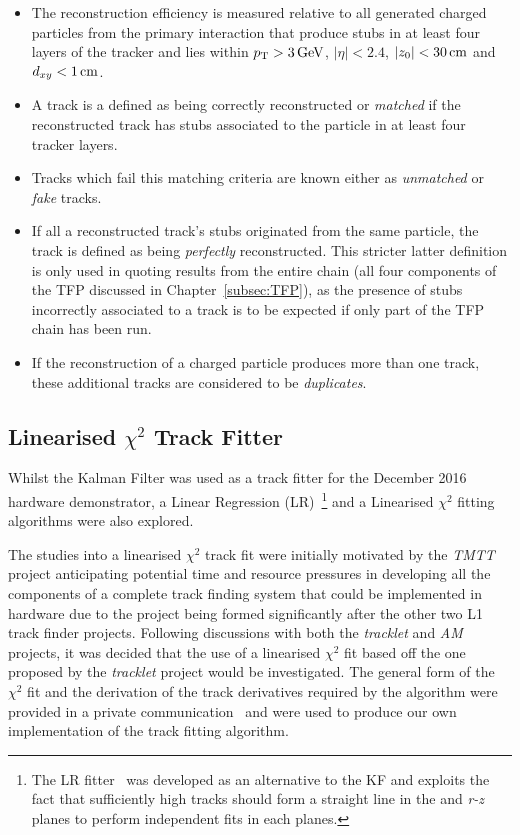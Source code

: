 \begin{itemize}
\item The reconstruction efficiency is measured relative to all generated charged particles from the primary interaction that produce stubs in at least four layers of the tracker and lies within $p_{\mathrm{T}} > 3\,\text{Ge\hspace{-.08em}V}$, $|\eta| < 2.4$, $|z_{0}| < 30\,\text{cm}$ and $d_{xy} < 1\,\text{cm}$.
\item A track is a defined as being correctly reconstructed or \emph{matched} if the reconstructed track has stubs associated to the particle in at least four tracker layers.
\item Tracks which fail this matching criteria are known either as \emph{unmatched} or \emph{fake} tracks.
\item If all a reconstructed track's stubs originated from the same particle, the track is defined as being \emph{perfectly} reconstructed. 
This stricter latter definition is only used in quoting results from the entire chain (\ie all four components of the TFP discussed in Chapter~\ref{subsec:TFP}), as the presence of stubs incorrectly associated to a track is to be expected if only part of the TFP chain has been run.
\item If the reconstruction of a charged particle produces more than one track, these additional tracks are considered to be \emph{duplicates}.
\end{itemize}

\subsection{Linearised $\chi^{2}$ Track Fitter}\label{subsec:chi2}
Whilst the Kalman Filter was used as a track fitter for the December 2016 hardware demonstrator, a Linear Regression (LR)~\footnote{The LR fitter~\cite{TMTT_FLP} was developed as an alternative to the KF and exploits the fact that sufficiently high \pT tracks should form a straight line in the \emph{\rphi} and \emph{r-z} planes to perform independent fits in each planes.} and a Linearised $\chi^{2}$ fitting algorithms were also explored.

The studies into a linearised $\chi^{2}$ track fit were initially motivated by the \emph{TMTT} project anticipating potential time and resource pressures in developing all the components of a complete track finding system that could be implemented in hardware due to the project being formed significantly after the other two L1 track finder projects.
Following discussions with both the \emph{tracklet} and \emph{AM} projects, it was decided that the use of a linearised $\chi^{2}$ fit based off the one proposed by the \emph{tracklet} project would be investigated.
The general form of the $\chi^{2}$ fit and the derivation of the track derivatives required by the algorithm were provided in a private communication~\cite{CMS_DN-14-043} and were used to produce our own implementation of the track fitting algorithm.


